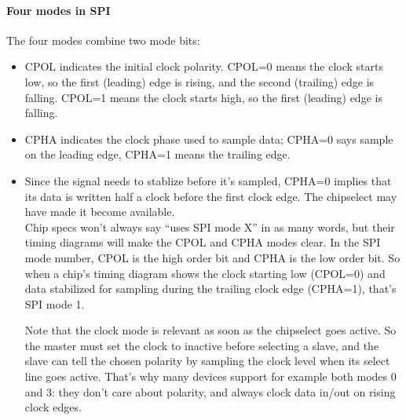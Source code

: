 \paragraph{Four modes in SPI}
The four modes combine two mode bits:\\
\begin{itemize}
 	\item CPOL indicates the initial clock polarity.  CPOL=0 means the clock starts low, so the first (leading) edge is rising, and the second (trailing) edge is falling.  CPOL=1 means the clock starts high, so the first (leading) edge is falling.
	  \item CPHA indicates the clock phase used to sample data; CPHA=0 says
	      sample on the leading edge, CPHA=1 means the trailing edge.
	   \item Since the signal needs to stablize before it's sampled, CPHA=0
		    implies that its data is written half a clock before the first
		       clock edge.  The chipselect may have made it become available.\\
		       Chip specs won't always say ``uses SPI mode X'' in as many words,
		       but their timing diagrams will make the CPOL and CPHA modes clear.
		       In the SPI mode number, CPOL is the high order bit and CPHA is the
		       low order bit.  So when a chip's timing diagram shows the clock
		       starting low (CPOL=0) and data stabilized for sampling during the
		       trailing clock edge (CPHA=1), that's SPI mode 1.

		       Note that the clock mode is relevant as soon as the chipselect goes
		       active.  So the master must set the clock to inactive before selecting
		       a slave, and the slave can tell the chosen polarity by sampling the
		       clock level when its select line goes active.  That's why many devices
		       support for example both modes 0 and 3:  they don't care about polarity,
		       and always clock data in/out on rising clock edges.
\end{itemize}

